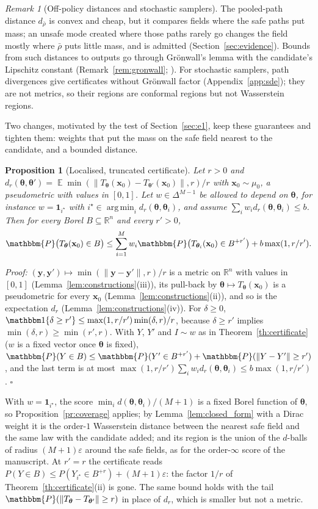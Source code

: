 \documentclass{article}
\DeclareMathOperator*{\argmin}{arg\,min}
\DeclareMathOperator{\E}{\mathbb{E}}
\newcommand{\RR}{\mathbb{R}}
\newcommand{\PP}{\mathbbm{P}}
\newcommand{\bth}{\boldsymbol{\theta}}
\newcommand{\bx}{\mathbf{x}}
\newcommand{\by}{\mathbf{y}}
\theoremstyle{plain}
\newtheorem{proposition}[theorem]{Proposition}
\theoremstyle{remark}
\newtheorem{remark}[theorem]{Remark}
\begin{document}
\begin{remark}[Off-policy distances and stochastic samplers]\label{rem:offpolicy}
The pooled-path distance $d_{\bar\rho}$ is convex and cheap, but it compares fields where the safe
paths put mass; an unsafe mode created where those paths rarely go changes the field mostly where
$\bar\rho$ puts little mass, and is admitted (Section~\ref{sec:evidence}). Bounds from such distances to
outputs go through Gr\"onwall's lemma with the candidate's Lipschitz constant
(Remark~\ref{rem:gronwall}; \citealt{benton2024error}). For stochastic samplers, path divergences give certificates without
Gr\"onwall factor (Appendix~\ref{app:sde}); they are not metrics, so their regions are conformal
regions but not Wasserstein regions.
\end{remark}

Two changes, motivated by the test of Section~\ref{sec:e1}, keep these guarantees and tighten them: weights
that put the mass on the safe field nearest to the candidate, and a bounded distance.

\begin{proposition}[Localised, truncated certificate]\label{pr:truncated}
Let $r>0$ and $d_r(\bth,\bth')=\E\min(\|T_{\bth}(\bx_0)-T_{\bth'}(\bx_0)\|,r)/r$ with $\bx_0\sim\mu_0$, a pseudometric with values in
$[0,1]$. Let $w\in\Delta^{M-1}$ be allowed to depend on $\bth$, for instance $w=\mathbf 1_{i^\star}$ with
$i^\star\in\argmin_id_r(\bth,\bth_i)$, and assume $\sum_iw_id_r(\bth,\bth_i)\le b$. Then for every Borel $B\subseteq\RR^n$ and
every $r'>0$,
\[
\PP\big(T_{\bth}(\bx_0)\in B\big)\le\sum_{i=1}^Mw_i\PP\big(T_{\bth_i}(\bx_0)\in B^{+r'}\big)+b\max(1,r/r').
\]
\end{proposition}
\textit{Proof:}
$(\by,\by')\mapsto\min(\|\by-\by'\|,r)/r$ is a metric on $\RR^n$ with values in $[0,1]$ (Lemma~\ref{lem:constructions}(iii)), its pull-back by
$\bth\mapsto T_{\bth}(\bx_0)$ is a pseudometric for every $\bx_0$ (Lemma~\ref{lem:constructions}(ii)), and so is the expectation $d_r$
(Lemma~\ref{lem:constructions}(iv)). For $\delta\ge0$,
$\mathbbm 1\{\delta\ge r'\}\le\max(1,r/r')\min(\delta,r)/r$, because $\delta\ge r'$ implies $\min(\delta,r)\ge\min(r',r)$. With $Y$, $Y'$ and $I\sim w$ as in Theorem~\ref{th:certificate} ($w$ is a fixed vector once
$\bth$ is fixed), $\PP(Y\in B)\le\PP(Y'\in B^{+r'})+\PP(\|Y-Y'\|\ge r')$, and the last term is at most
$\max(1,r/r')\sum_iw_id_r(\bth,\bth_i)\le b\max(1,r/r')$. \hfill$\square$

With $w=\mathbf 1_{i^\star}$, the score $\min_id(\bth,\bth_i)/(M+1)$ is a fixed Borel function of $\bth$, so
Proposition~\ref{pr:coverage} applies; by Lemma~\ref{lem:closed_form} with a Dirac weight it is the order-$1$
Wasserstein distance between the nearest safe field and the same law with the candidate added; and its
region is the union of the $d$-balls of radius $(M+1)\varepsilon$ around the safe fields, as for the order-$\infty$
score of the manuscript. At $r'=r$ the certificate reads $P(Y\in B)\le P(Y_{i^\star}\in B^{+r})+(M+1)\varepsilon$: the factor
$1/r$ of Theorem~\ref{th:certificate}(ii) is gone. The same bound holds with the tail $\PP(\|T_{\bth}-T_{\bth'}\|\ge r)$ in
place of $d_r$, which is smaller but not a metric.
\end{document}
